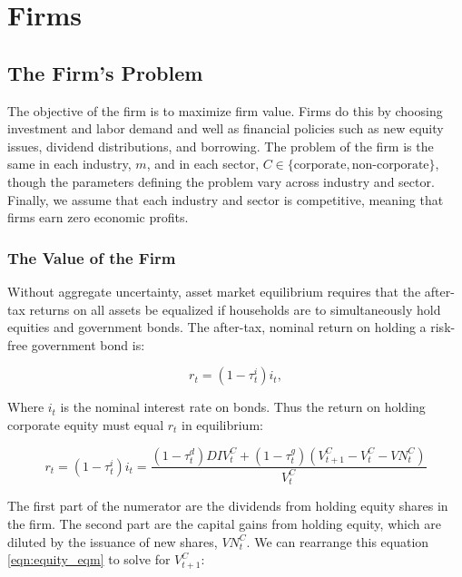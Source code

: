 \chapter{Firms}
%



\section{The Firm's Problem}

The objective of the firm is to maximize firm value.  Firms do this by choosing investment and labor demand and well as financial policies such as new equity issues, dividend distributions, and borrowing.  The problem of the firm is the same in each industry, $m$, and in each sector, $C\in\{\text{corporate},\text{non-corporate}\}$, though the parameters defining the problem vary across industry and sector.  Finally, we assume that each industry and sector is competitive, meaning that firms earn zero economic profits.

\subsection{The Value of the Firm}

Without aggregate uncertainty, asset market equilibrium requires that the after-tax returns on all assets be equalized if households are to simultaneously hold equities and government bonds.  The after-tax, nominal return on holding a risk-free government bond is:

\begin{equation}
\label{eqn:r}
r_{t}=(1-\tau^{i}_{t})i_{t},
\end{equation}

\noindent\noindent Where $i_{t}$ is the nominal interest rate on bonds.  Thus the return on holding corporate equity must equal $r_{t}$ in equilibrium:

\begin{equation}
\label{eqn:equity_eqm}
r_{t}=(1-\tau^{i}_{t})i_{t}=\frac{(1-\tau^{d}_{t})DIV^{C}_{t}+(1-\tau^{g}_{t})(V^{C}_{t+1}-V^{C}_{t}-VN^{C}_{t})}{V^{C}_{t}}
\end{equation}

The first part of the numerator are the dividends from holding equity shares in the firm.  The second part are the capital gains from holding equity, which are diluted by the issuance of new shares, $VN^{C}_{t}$.  We can rearrange this equation \ref{eqn:equity_eqm} to solve for $V^{C}_{t+1}$:

